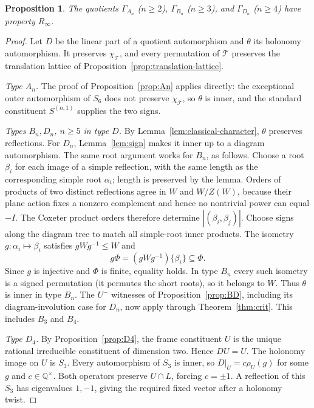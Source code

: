 \documentclass[11pt]{article}
\newtheorem{proposition}[theorem]{Proposition}
\theoremstyle{definition}
\newcommand{\Q}{\mathbb{Q}}
\newcommand{\T}{\mathcal{T}}
\newcommand{\Rinf}{R_\infty}
\begin{document}
\begin{proposition}\label{prop:classical-quotients}
The quotients $\Gamma_{A_n}$ ($n\ge2$), $\Gamma_{B_n}$ ($n\ge3$), and $\Gamma_{D_n}$ ($n\ge4$)
have property $\Rinf$.
\end{proposition}
\begin{proof}
Let $D$ be the linear part of a quotient automorphism and $\theta$ its holonomy automorphism.
It preserves $\chi_\T$, and every permutation of $\T$ preserves the translation lattice of Proposition~\ref{prop:translation-lattice}.

\emph{Type $A_n$.} The proof of Proposition~\ref{prop:An} applies directly: the exceptional outer
automorphism of $S_6$ does not preserve $\chi_\T$, so $\theta$ is inner, and the standard constituent
$S^{(n,1)}$ supplies the two signs.

\emph{Types $B_n,D_n$, $n\ge5$ in type $D$.} By Lemma~\ref{lem:classical-character}, $\theta$ preserves
reflections. For $D_n$, Lemma~\ref{lem:sign} makes it inner up to a diagram automorphism.
The same root argument works for $B_n$, as follows. Choose a root $\beta_i$ for each image of a simple
reflection, with the same length as the corresponding simple root $\alpha_i$; length is preserved by the lemma.
Orders of products of two distinct reflections agree in $W$ and $W/Z(W)$, because their plane action
fixes a nonzero complement and hence no nontrivial power can equal $-I$.
The Coxeter product orders therefore determine $|(\beta_i,\beta_j)|$.
Choose signs along the diagram tree to match all simple-root inner products. The isometry $g\colon\alpha_i\mapsto\beta_i$ satisfies $gWg^{-1}\le W$ and
\[g\Phi=(gWg^{-1})\{\beta_i\}\subseteq\Phi.\]
Since $g$ is injective and $\Phi$ is finite, equality holds. In type $B_n$ every such isometry is a signed permutation
(it permutes the short roots), so it belongs to $W$. Thus $\theta$ is inner in type $B_n$.
The $U^-$ witnesses of Proposition~\ref{prop:BD}, including its diagram-involution case for $D_n$,
now apply through Theorem~\ref{thm:crit}. This includes $B_3$ and $B_4$.

\emph{Type $D_4$.} By Proposition~\ref{prop:D4}, the frame constituent $U$ is the unique rational irreducible
constituent of dimension two. Hence $DU=U$.
The holonomy image on $U$ is $S_3$. Every automorphism of $S_3$ is inner, so $D|_U=c\rho_U(g)$ for some
$g$ and $c\in\Q^\times$. Both operators preserve $U\cap L$, forcing $c=\pm1$.
A reflection of this $S_3$ has eigenvalues $1,-1$, giving the required fixed vector after a holonomy twist.
\end{proof}
\end{document}
